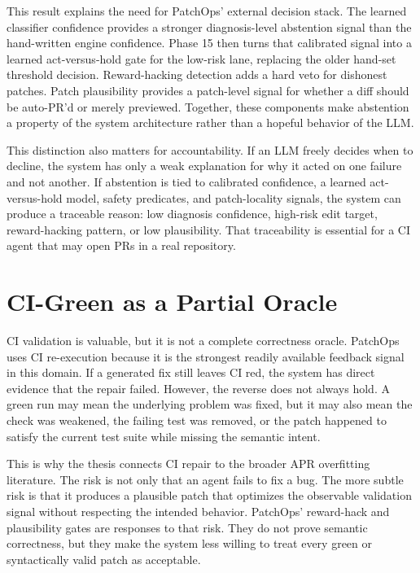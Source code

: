 This result explains the need for PatchOps' external decision stack. The learned classifier confidence provides
a stronger diagnosis-level abstention signal than the hand-written engine confidence. Phase 15 then turns that
calibrated signal into a learned act-versus-hold gate for the low-risk lane, replacing the older hand-set
threshold decision. Reward-hacking detection adds a hard veto for dishonest patches. Patch plausibility provides
a patch-level signal for whether a diff should be auto-PR'd or merely previewed. Together, these components make
abstention a property of the system architecture rather than a hopeful behavior of the LLM.

This distinction also matters for accountability. If an LLM freely decides when to decline, the system has only
a weak explanation for why it acted on one failure and not another. If abstention is tied to calibrated
confidence, a learned act-versus-hold model, safety predicates, and patch-locality signals, the system can
produce a traceable reason: low diagnosis confidence, high-risk edit target, reward-hacking pattern, or low
plausibility. That traceability is essential for a CI agent that may open PRs in a real repository.

\section{CI-Green as a Partial Oracle}

CI validation is valuable, but it is not a complete correctness oracle. PatchOps uses CI re-execution because it
is the strongest readily available feedback signal in this domain. If a generated fix still leaves CI red, the
system has direct evidence that the repair failed. However, the reverse does not always hold. A green run may
mean the underlying problem was fixed, but it may also mean the check was weakened, the failing test was removed,
or the patch happened to satisfy the current test suite while missing the semantic intent.

This is why the thesis connects CI repair to the broader APR overfitting literature. The risk is not only that
an agent fails to fix a bug. The more subtle risk is that it produces a plausible patch that optimizes the
observable validation signal without respecting the intended behavior. PatchOps' reward-hack and plausibility
gates are responses to that risk. They do not prove semantic correctness, but they make the system less willing
to treat every green or syntactically valid patch as acceptable.

